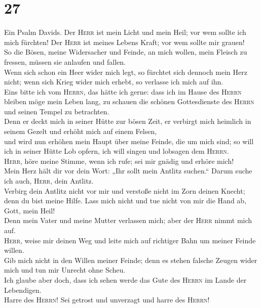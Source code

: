 \hypertarget{section-26}{%
\section{27}\label{section-26}}

 Ein Psalm Davids. Der \textsc{Herr} ist mein Licht und
mein Heil; vor wem sollte ich mich fürchten! Der \textsc{Herr} ist
meines Lebens Kraft; vor wem sollte mir grauen!\\
 So die Bösen, meine Widersacher und Feinde, an mich
wollen, mein Fleisch zu fressen, müssen sie anlaufen und fallen.\\
 Wenn sich schon ein Heer wider mich legt, so fürchtet
sich dennoch mein Herz nicht; wenn sich Krieg wider mich erhebt, so
verlasse ich mich auf ihn.\\
 Eins bitte ich vom \textsc{Herrn}, das hätte ich gerne:
dass ich im Hause des \textsc{Herrn} bleiben möge mein Leben lang, zu
schauen die schönen Gottesdienste des \textsc{Herrn} und seinen Tempel
zu betrachten.\\
 Denn er deckt mich in seiner Hütte zur bösen Zeit, er
verbirgt mich heimlich in seinem Gezelt und erhöht mich auf einem
Felsen,\\
 und wird nun erhöhen mein Haupt über meine Feinde, die um
mich sind; so will ich in seiner Hütte Lob opfern, ich will singen und
lobsagen dem \textsc{Herrn}.\\
 \textsc{Herr}, höre meine Stimme, wenn ich rufe; sei mir
gnädig und erhöre mich!\\
 Mein Herz hält dir vor dein Wort: „Ihr sollt mein Antlitz
suchen.`` Darum suche ich auch, \textsc{Herr}, dein Antlitz.\\
 Verbirg dein Antlitz nicht vor mir und verstoße nicht im
Zorn deinen Knecht; denn du bist meine Hilfe. Lass mich nicht und tue
nicht von mir die Hand ab, Gott, mein Heil!\\
 Denn mein Vater und meine Mutter verlassen mich; aber
der \textsc{Herr} nimmt mich auf.\\
 \textsc{Herr}, weise mir deinen Weg und leite mich auf
richtiger Bahn um meiner Feinde willen.\\
 Gib mich nicht in den Willen meiner Feinde; denn es
stehen falsche Zeugen wider mich und tun mir Unrecht ohne Scheu.\\
 Ich glaube aber doch, dass ich sehen werde das Gute des
\textsc{Herrn} im Lande der Lebendigen.\\
 Harre des \textsc{Herrn}! Sei getrost und unverzagt und
harre des \textsc{Herrn}!

